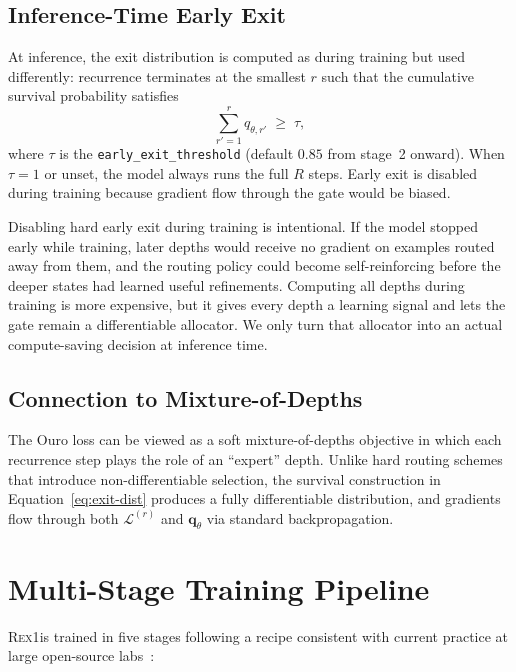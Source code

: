 \documentclass[11pt,a4paper]{article}
\newcommand{\REX}{\textsc{Rex1}\xspace}
\providecommand{\xspace}{}
\begin{document}
\subsection{Inference-Time Early Exit}

At inference, the exit distribution is computed as during training but used
differently: recurrence terminates at the smallest $r$ such that the
cumulative survival probability satisfies
\begin{equation}
\sum_{r'=1}^{r} q_{\theta,r'} \;\ge\; \tau,
\end{equation}
where $\tau$ is the \texttt{early\_exit\_threshold} (default $0.85$ from
stage~2 onward). When $\tau = 1$ or unset, the model always runs the full
$R$ steps. Early exit is disabled during training because gradient flow
through the gate would be biased.

Disabling hard early exit during training is intentional. If the model stopped
early while training, later depths would receive no gradient on examples routed
away from them, and the routing policy could become self-reinforcing before the
deeper states had learned useful refinements. Computing all depths during
training is more expensive, but it gives every depth a learning signal and lets
the gate remain a differentiable allocator. We only turn that allocator into an
actual compute-saving decision at inference time.

\subsection{Connection to Mixture-of-Depths}

The Ouro loss can be viewed as a soft mixture-of-depths objective in which
each recurrence step plays the role of an ``expert'' depth. Unlike hard
routing schemes that introduce non-differentiable selection, the survival
construction in Equation~\ref{eq:exit-dist} produces a fully differentiable
distribution, and gradients flow through both $\mathcal{L}^{(r)}$ and
$\mathbf{q}_{\theta}$ via standard backpropagation.

\section{Multi-Stage Training Pipeline}

\REX is trained in five stages following a recipe consistent with current
practice at large open-source labs~\cite{olmo2,nemotron,smollm2}:
\end{document}
